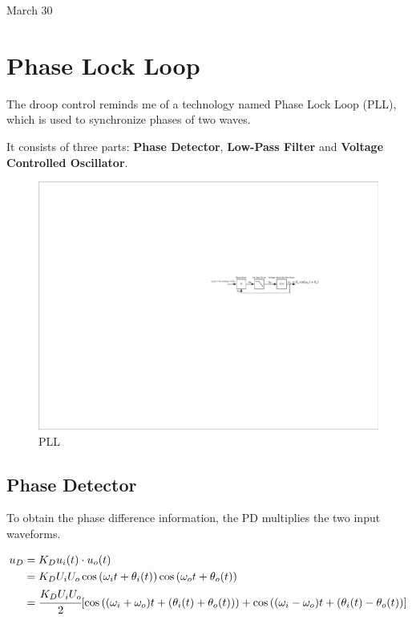\univlogo

{\Huge March 30}\vspace{5mm}

\section*{Phase Lock Loop}

The droop control reminds me of a technology named Phase Lock Loop (PLL), which is used to synchronize phases of two waves.

It consists of three parts: \textbf{Phase Detector}, \textbf{Low-Pass Filter} and \textbf{Voltage Controlled Oscillator}.

\begin{figure}[H]
\centering
\includegraphics[width=1\textwidth]{./2023Mar/PLL.pdf}
\caption{PLL}
\label{PLL}
\end{figure}

\subsection*{Phase Detector}

To obtain the phase difference information, the PD multiplies the two input waveforms.

\begin{equation}
\begin{aligned}
    u_D&=K_Du_i(t)\cdot u_o(t) \\
    &=K_DU_iU_o\cos{(\omega_i t+\theta_i(t))}\cos{(\omega_o t +\theta_o(t))}\\
    &=\cfrac{K_DU_iU_o}{2}[\cos{((\omega_i+\omega_o)t+(\theta_i(t)+\theta_o(t)))}+\cos{((\omega_i-\omega_o)t+(\theta_i(t)-\theta_o(t))}]
\end{aligned}
\end{equation}

